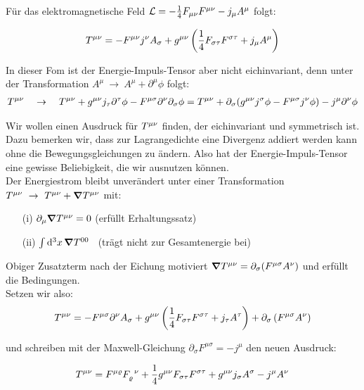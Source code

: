 Für das elektromagnetische Feld $\mathcal{L} = -\frac{1}{4} F_{\mu \nu} F^{\mu \nu} - j_{\mu}A^{\mu}$ folgt:

\begin{align}
T^{\mu\nu} = - F^{\mu \nu} j^{\nu}A_{\sigma}+g^{\mu\nu}\left( \frac{1}{4} F_{\sigma\tau}F^{\sigma\tau}+j_{\mu}A^{\mu}\right)
\end{align}

In dieser Fom ist der Energie-Impuls-Tensor aber nicht eichinvariant, denn unter der Transformation $A^{\mu} \ \rightarrow \ A^{\mu} + \partial^{\mu}\phi$ folgt:
\begin{align}
T^{\mu\nu} \quad \rightarrow \quad T^{\mu\nu} + g^{\mu\nu}j_{\tau}\partial^{\tau}\phi-F^{\mu\sigma}\partial^{\nu}\partial_{\sigma}\phi = T^{\mu\nu} + \partial_{\sigma}(g^{\mu\nu}j^{\sigma}\phi - F^{\mu\sigma}j^{\nu}\phi) - j^{\mu}\partial^{\nu}\phi
\end{align}

Wir wollen einen Ausdruck für $T^{\mu\nu}$ finden, der eichinvariant und symmetrisch ist. \\
Dazu bemerken wir, dass zur Lagrangedichte eine Divergenz addiert werden kann ohne die Bewegungsgleichungen zu ändern. Also hat der Energie-Impuls-Tensor eine gewisse Beliebigkeit, die wir ausnutzen können. \\
Der Energiestrom bleibt unverändert unter einer Transformation $T^{\mu\nu} \ \rightarrow \ T^{\mu\nu}+ \grad{T^{\mu\nu}}$ mit: 

\begin{enumerate}
\item[(i)] $\partial_{\mu}\grad{T^{\mu\nu}}=0$ \qquad (erfüllt Erhaltungssatz)
\item[(ii)] $ \int \dd[3]{x} \grad{T^{00}}$ \qquad \ (trägt nicht zur Gesamtenergie bei)
\end{enumerate}

Obiger Zusatzterm nach der Eichung motiviert $\grad{T^{\mu\nu}}=\partial_{\sigma}(F^{\mu\sigma}A^{\nu})$ und erfüllt die Bedingungen. \\
Setzen wir also:
\begin{align}
T^{\mu\nu} = -F^{\mu\sigma}\partial^{\nu}A_{\sigma} + g^{\mu\nu}\left( \frac{1}{4}F_{\sigma\tau}F^{\sigma\tau} + j_{\tau}A^{\tau} \right) + \partial_{\sigma} \left(F^{\mu\sigma}A^{\nu} \right)
\end{align}

und schreiben mit der Maxwell-Gleichung $\partial_{\sigma}F^{\mu\sigma}=-j^{\mu}$ den neuen Ausdruck:

\begin{align}
T^{\mu\nu} = F^{\mu\varrho}F_{\varrho}^{\phantom{\varrho}\nu} + \frac{1}{4}g^{\mu\nu}F_{\sigma\tau}F^{\sigma\tau} + g^{\mu\nu}j_{\sigma}A^{\sigma} - j^{\mu}A^{\nu}
\end{align}

